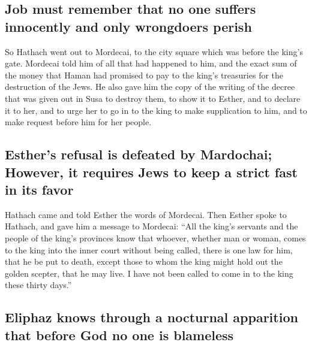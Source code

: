 \hypertarget{job-must-remember-that-no-one-suffers-innocently-and-only-wrongdoers-perish}{%
\subsection{Job must remember that no one suffers innocently and only
wrongdoers
perish}\label{job-must-remember-that-no-one-suffers-innocently-and-only-wrongdoers-perish}}

 So Hathach went out to Mordecai, to the city square which
was before the king's gate.  Mordecai told him of all that
had happened to him, and the exact sum of the money that Haman had
promised to pay to the king's treasuries for the destruction of the
Jews.  He also gave him the copy of the writing of the
decree that was given out in Susa to destroy them, to show it to Esther,
and to declare it to her, and to urge her to go in to the king to make
supplication to him, and to make request before him for her people.

\hypertarget{esthers-refusal-is-defeated-by-mardochai-however-it-requires-jews-to-keep-a-strict-fast-in-its-favor}{%
\subsection{Esther's refusal is defeated by Mardochai; However, it
requires Jews to keep a strict fast in its
favor}\label{esthers-refusal-is-defeated-by-mardochai-however-it-requires-jews-to-keep-a-strict-fast-in-its-favor}}

 Hathach came and told Esther the words of Mordecai.
 Then Esther spoke to Hathach, and gave him a message to
Mordecai:  ``All the king's servants and the people of
the king's provinces know that whoever, whether man or woman, comes to
the king into the inner court without being called, there is one law for
him, that he be put to death, except those to whom the king might hold
out the golden scepter, that he may live. I have not been called to come
in to the king these thirty days.''

\hypertarget{eliphaz-knows-through-a-nocturnal-apparition-that-before-god-no-one-is-blameless}{%
\subsection{Eliphaz knows through a nocturnal apparition that before God
no one is
blameless}\label{eliphaz-knows-through-a-nocturnal-apparition-that-before-god-no-one-is-blameless}}

